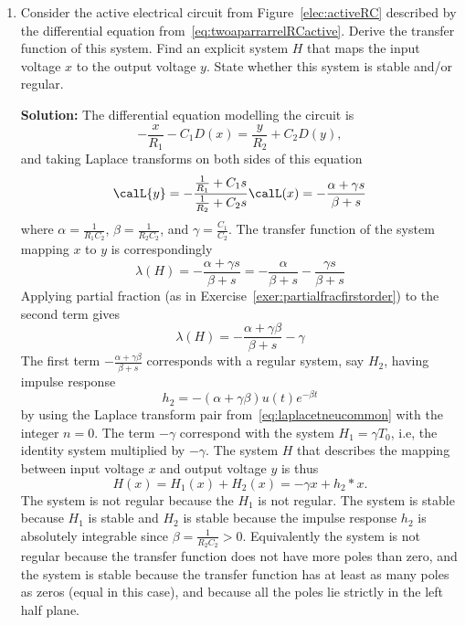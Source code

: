 \documentclass[11pt,a4paper]{book}
\theoremstyle{plain}
\numberwithin{equation}{section}
\newenvironment{solution}{\begin{footnotesize}\textbf{Solution:}}{\end{footnotesize}}
\newenvironment{excersizelist}{%
  \renewcommand*{\theenumi}{\thechapter.\arabic{enumi}}%
  \newcommand\itemadvanced{\stepcounter{enumi}\item[$\ast$\, \theenumi.]}
  \begin{enumerate}
}{%
  \end{enumerate}
}
\begin{document}
\begin{excersizelist}
\item Consider the active electrical circuit from Figure~\ref{elec:activeRC} described by the differential equation from~\eqref{eq:twoaparrarrelRCactive}.  Derive the transfer function of this system.  Find an explicit system $H$ that maps the input voltage $x$ to the output voltage $y$.  State whether this system is stable and/or regular.
\begin{solution}
The differential equation modelling the circuit is
\[
-\frac{x}{R_1} - C_1 D(x) = \frac{y}{R_2} + C_2 D(y),
\]
and taking Laplace transforms on both sides of this equation
\[
\calL{y} = -\frac{\tfrac{1}{R_1} + C_1s}{\tfrac{1}{R_2} + C_2s} \calL(x) = -\frac{\alpha + \gamma s}{\beta + s}
\]
where $\alpha = \tfrac{1}{R_1C_2}$, $\beta = \tfrac{1}{R_2C_2}$, and $\gamma = \tfrac{C_1}{C_2}$.  The transfer function of the system mapping $x$ to $y$ is correspondingly
\[
\lambda(H) = -\frac{\alpha + \gamma s}{\beta + s} = -\frac{\alpha}{\beta + s} - \frac{\gamma s}{\beta + s}
\]
Applying partial fraction (as in Exercise~\ref{exer:partialfracfirstorder}) to the second term gives
\[
\lambda(H) = -\frac{\alpha + \gamma\beta}{\beta + s} - \gamma
\]
The first term $-\frac{\alpha + \gamma\beta}{\beta + s}$ corresponds with a regular system, say $H_2$, having impulse response
\[
h_2 = -(\alpha + \gamma\beta) u(t) e^{-\beta t}
\]
by using the Laplace transform pair from~\eqref{eq:laplacetneucommon} with the integer $n=0$.  The term $-\gamma$ correspond with the system $H_1 = \gamma T_0$, i.e, the identity system multiplied by $-\gamma$.  The system $H$ that describes the mapping between input voltage $x$ and output voltage $y$ is thus
\[
H(x) = H_1(x) + H_2(x) = -\gamma x + h_2 * x.
\]
The system is not regular because the $H_1$ is not regular.  The system is stable because $H_1$ is stable and $H_2$ is stable because the impulse response $h_2$ is absolutely integrable since $\beta = \tfrac{1}{R_2C_2} > 0$.  Equivalently the system is not regular because the transfer function does not have more poles than zero, and the system is stable because the transfer function has at least as many poles as zeros (equal in this case), and because all the poles lie strictly in the left half plane. 
\end{solution}


\end{excersizelist}
\end{document}
